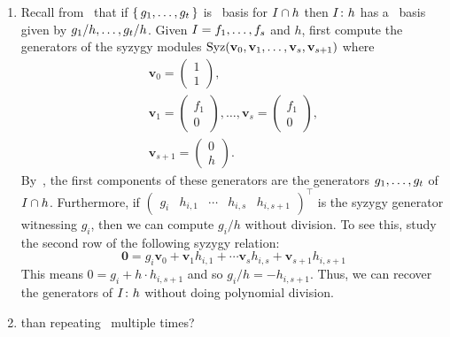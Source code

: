 \documentclass[letterpaper, 11pt, oneside]{book}
\begin{document}
\begin{sol}\label{ex:UAG_5.3.10}
  \begin{enumerate}
    \item Recall from~\cite[]{book:UAG} that if $\set{g_{1}, \ldots, g_{t}}$ is \Grobner\ basis for $I \cap \ideal{h}$ then $I \colon \ideal{h}$ has a \Grobner\ basis given by $\ideal{g_{1} / h, \ldots, g_{t} / h}$.
          Given $I = \gen{f_{1}, \ldots, f_{s}}$ and $h$, first compute the generators of the syzygy modules $\operatorname{Syz}(\mathbf{v}_{0}, \mathbf{v}_{1}, \ldots, \mathbf{v}_{s}, \mathbf{v}_{s + 1})$ where
          \begin{gather*}
            \mathbf{v}_{0} = \begin{pmatrix} 1 \\ 1 \end{pmatrix}, \\
            \mathbf{v}_{1} = \begin{pmatrix} f_{1} \\ 0 \end{pmatrix}, \ldots, \mathbf{v}_{s} = \begin{pmatrix} f_{1} \\ 0 \end{pmatrix}, \\
            \mathbf{v}_{s + 1} = \begin{pmatrix} 0 \\ h \end{pmatrix}.
          \end{gather*}
          By~\cite[\S 5.3, Proposition 3.11]{book:UAG}, the first components of these generators are the generators $\ideal{g_{1}, \ldots, g_{t}}$ of $I \cap \ideal{h}$.
          Furthermore, if  $\begin{pmatrix} g_{i} & h_{i, 1} & \cdots & h_{i, s} & h_{i, s + 1} \end{pmatrix}^{\top}$ is the syzygy generator witnessing $g_{i}$, then we can compute $g_{i} / h$ without division.
          To see this, study the second row of the following syzygy relation:
          \[
            \mathbf{0} = g_{i}\mathbf{v}_{0} + \mathbf{v}_{1} h_{i, 1} + \cdots \mathbf{v}_{s} h_{i, s} + \mathbf{v}_{s + 1} h_{i, s + 1}
          \]
          This means $0 = g_{i} + h \cdot h_{i, s + 1}$ and so $g_{i} / h = -h_{i, s + 1}$.
          Thus, we can recover the generators of $I \colon \ideal{h}$ without doing polynomial division.
    \item {} than repeating~\cite[\S 5.3, Proposition 3.11]{book:UAG} multiple times?
  \end{enumerate}
\end{sol}
\end{document}
